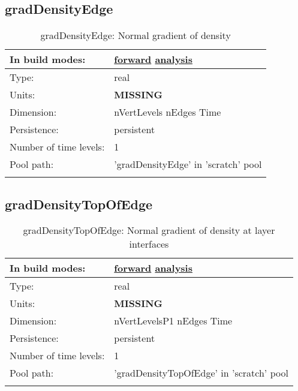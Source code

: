 \subsection[gradDensityEdge]{gradDensityEdge}
\label{subsec:var_sec_scratch_gradDensityEdge}
\begin{center}
\begin{longtable}{| p{2.0in} | p{4.0in} |}
        \hline 
        In build modes: & \hyperref[subsec:forward_var_tab_scratch]{forward} \hyperref[subsec:analysis_var_tab_scratch]{analysis} \\
        \hline 
        Type: & real \\
        \hline 
        Units: & {\bf \color{red} MISSING} \\
        \hline 
        Dimension: & nVertLevels nEdges Time \\
        \hline 
        Persistence: & persistent \\
        \hline 
        Number of time levels: & 1 \\
        \hline 
            Pool path: & 'gradDensityEdge' in 'scratch' pool
 \\
		 \hline 
    \caption{gradDensityEdge: Normal gradient of density}
\end{longtable}
\end{center}
\subsection[gradDensityTopOfEdge]{gradDensityTopOfEdge}
\label{subsec:var_sec_scratch_gradDensityTopOfEdge}
\begin{center}
\begin{longtable}{| p{2.0in} | p{4.0in} |}
        \hline 
        In build modes: & \hyperref[subsec:forward_var_tab_scratch]{forward} \hyperref[subsec:analysis_var_tab_scratch]{analysis} \\
        \hline 
        Type: & real \\
        \hline 
        Units: & {\bf \color{red} MISSING} \\
        \hline 
        Dimension: & nVertLevelsP1 nEdges Time \\
        \hline 
        Persistence: & persistent \\
        \hline 
        Number of time levels: & 1 \\
        \hline 
            Pool path: & 'gradDensityTopOfEdge' in 'scratch' pool
 \\
		 \hline 
    \caption{gradDensityTopOfEdge: Normal gradient of density at layer interfaces}
\end{longtable}
\end{center}
